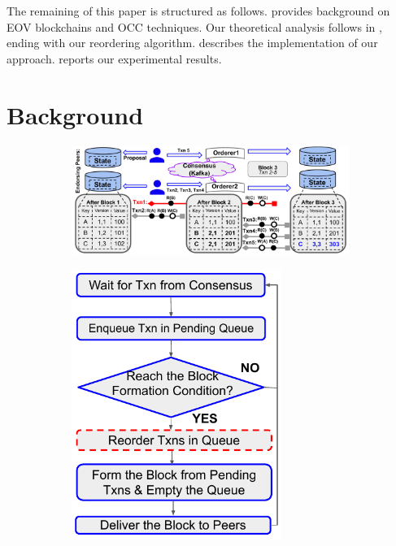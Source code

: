 The remaining of this paper is structured as follows.
%
 provides background on EOV blockchains and OCC techniques. 
%
Our theoretical analysis follows in , ending with our
reordering algorithm.
%
 describes the implementation of our approach.
%
 reports our experimental results.

\section{Background}
\label{sec:txn:background}
\begin{figure}[h!]
    \begin{subfigure}{0.71\textwidth}
      \centering
      \includegraphics[width=0.99\textwidth]{diagram/txn/background.pdf}
      \caption{}
      \label{diagram:txn:background_fabric}
    \end{subfigure}
    \begin{subfigure}{0.28\textwidth}
      \centering
      \includegraphics[width=0.75\textwidth]{diagram/txn/fabric_orderer.pdf}

\end{subfigure}
\end{figure}
